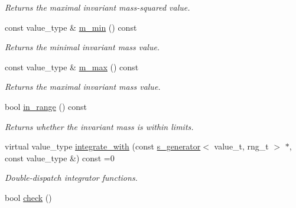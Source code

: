 \begin{DoxyCompactItemize}
\begin{DoxyCompactList}\small\item\em Returns the maximal invariant mass-\/squared value. \end{DoxyCompactList}\item 
\hypertarget{a00482_a2aa959ed043ad4b2d110bcb6e732a98f}{const value\-\_\-type \& \hyperlink{a00482_a2aa959ed043ad4b2d110bcb6e732a98f}{m\-\_\-min} () const }\label{a00482_a2aa959ed043ad4b2d110bcb6e732a98f}

\begin{DoxyCompactList}\small\item\em Returns the minimal invariant mass value. \end{DoxyCompactList}\item 
\hypertarget{a00482_a75596e95d7019ff56d50d9e4705e887a}{const value\-\_\-type \& \hyperlink{a00482_a75596e95d7019ff56d50d9e4705e887a}{m\-\_\-max} () const }\label{a00482_a75596e95d7019ff56d50d9e4705e887a}

\begin{DoxyCompactList}\small\item\em Returns the maximal invariant mass value. \end{DoxyCompactList}\item 
\hypertarget{a00482_a0037d2658c6c2c171f8435827f904488}{bool \hyperlink{a00482_a0037d2658c6c2c171f8435827f904488}{in\-\_\-range} () const }\label{a00482_a0037d2658c6c2c171f8435827f904488}

\begin{DoxyCompactList}\small\item\em Returns whether the invariant mass is within limits. \end{DoxyCompactList}\item 
\hypertarget{a00482_ac6e58e2fcde85903d7b8a75d4a26e4ba}{virtual value\-\_\-type \hyperlink{a00482_ac6e58e2fcde85903d7b8a75d4a26e4ba}{integrate\-\_\-with} (const \hyperlink{a00482}{s\-\_\-generator}$<$ value\-\_\-t, rng\-\_\-t $>$ $\ast$, const value\-\_\-type \&) const =0}\label{a00482_ac6e58e2fcde85903d7b8a75d4a26e4ba}

\begin{DoxyCompactList}\small\item\em Double-\/dispatch integrator functions. \end{DoxyCompactList}\item 
\hypertarget{a00482_a973e4b05f464c622e4a4d8a700454764}{bool \hyperlink{a00482_a973e4b05f464c622e4a4d8a700454764}{check} ()}\label{a00482_a973e4b05f464c622e4a4d8a700454764}


\end{DoxyCompactItemize}
